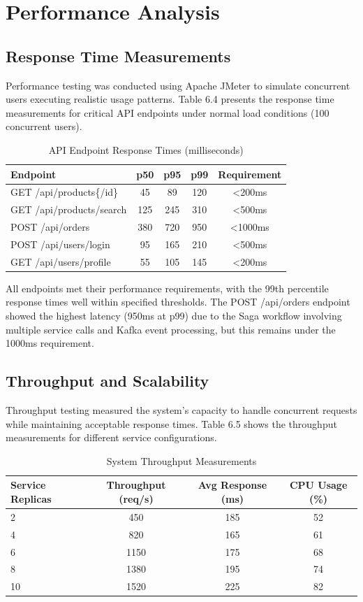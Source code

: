 \section{Performance Analysis}

\subsection{Response Time Measurements}

Performance testing was conducted using Apache JMeter to simulate concurrent users executing realistic usage patterns. Table 6.4 presents the response time measurements for critical API endpoints under normal load conditions (100 concurrent users).

\begin{table}[h]
\centering
\caption{API Endpoint Response Times (milliseconds)}
\begin{tabular}{|l|c|c|c|c|}
\hline
\textbf{Endpoint} & \textbf{p50} & \textbf{p95} & \textbf{p99} & \textbf{Requirement} \\
\hline
GET /api/products\{/id\} & 45 & 89 & 120 & <200ms \\
GET /api/products/search & 125 & 245 & 310 & <500ms \\
POST /api/orders & 380 & 720 & 950 & <1000ms \\
POST /api/users/login & 95 & 165 & 210 & <500ms \\
GET /api/users/profile & 55 & 105 & 145 & <200ms \\
\hline
\end{tabular}
\end{table}

All endpoints met their performance requirements, with the 99th percentile response times well within specified thresholds. The POST /api/orders endpoint showed the highest latency (950ms at p99) due to the Saga workflow involving multiple service calls and Kafka event processing, but this remains under the 1000ms requirement.

\subsection{Throughput and Scalability}

Throughput testing measured the system's capacity to handle concurrent requests while maintaining acceptable response times. Table 6.5 shows the throughput measurements for different service configurations.

\begin{table}[h]
\centering
\caption{System Throughput Measurements}
\begin{tabular}{|l|c|c|c|}
\hline
\textbf{Service Replicas} & \textbf{Throughput (req/s)} & \textbf{Avg Response (ms)} & \textbf{CPU Usage (\%)} \\
\hline
2 & 450 & 185 & 52 \\
4 & 820 & 165 & 61 \\
6 & 1150 & 175 & 68 \\
8 & 1380 & 195 & 74 \\
10 & 1520 & 225 & 82 \\
\hline
\end{tabular}
\end{table}


